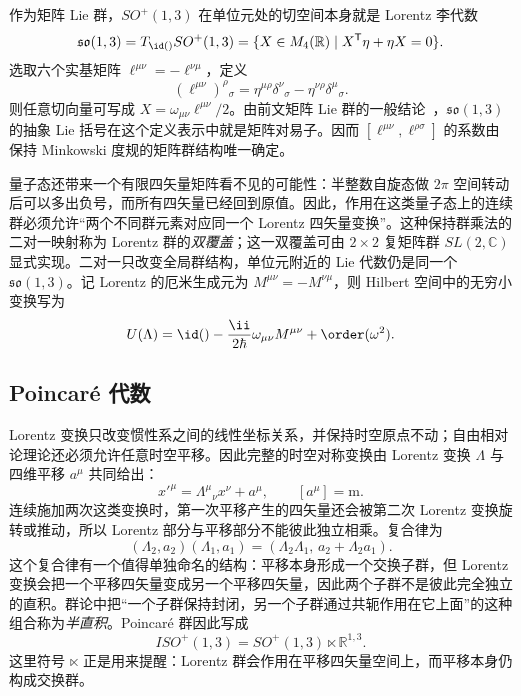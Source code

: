 作为矩阵 Lie 群，$SO^+(1,3)$ 在单位元处的切空间本身就是 Lorentz 李代数
\begin{equation}
{
\mathfrak{so}(1,3)
=T_{\id()}SO^+(1,3)
=\{X\in M_4(\mathbb R)\mid X^{\mathsf T}\eta+\eta X=0\}.}
\label{eq:lorentz-lie-algebra-tangent}
\end{equation}
选取六个实基矩阵 $\ell^{\mu\nu}=-\ell^{\nu\mu}$，定义
\begin{equation}
{
(\ell^{\mu\nu})^\rho{}_{\sigma}
=\eta^{\mu\rho}\delta^\nu{}_{\sigma}
-\eta^{\nu\rho}\delta^\mu{}_{\sigma}.}
\label{eq:lorentz-matrix-basis}
\end{equation}
则任意切向量可写成 $X=\omega_{\mu\nu}\ell^{\mu\nu}/2$。由前文矩阵 Lie 群的一般结论~，$\mathfrak{so}(1,3)$ 的抽象 Lie 括号在这个定义表示中就是矩阵对易子。因而 $[\ell^{\mu\nu},\ell^{\rho\sigma}]$ 的系数由保持 Minkowski 度规的矩阵群结构唯一确定。

量子态还带来一个有限四矢量矩阵看不见的可能性：半整数自旋态做 $2\pi$ 空间转动后可以多出负号，而所有四矢量已经回到原值。因此，作用在这类量子态上的连续群必须允许“两个不同群元素对应同一个 Lorentz 四矢量变换”。这种保持群乘法的二对一映射称为 Lorentz 群的\emph{双覆盖}；这一双覆盖可由 $2\times2$ 复矩阵群 $SL(2,\mathbb C)$ 显式实现。二对一只改变全局群结构，单位元附近的 Lie 代数仍是同一个 $\mathfrak{so}(1,3)$。记 Lorentz 的厄米生成元为 $M^{\mu\nu}=-M^{\nu\mu}$，则 Hilbert 空间中的无穷小变换写为
\begin{equation}
 U(\Lambda)
 =\id()-\frac{\ii}{2\hbar}\omega_{\mu\nu}M^{\mu\nu}+\order(\omega^2).
 \label{eq:lorentz-unitary}
\end{equation}
\subsection{Poincar\'e 代数}

Lorentz 变换只改变惯性系之间的线性坐标关系，并保持时空原点不动；自由相对论理论还必须允许任意时空平移。因此完整的时空对称变换由 Lorentz 变换 $\Lambda$ 与四维平移 $a^\mu$ 共同给出：
\begin{equation}
 x'^\mu=\Lambda^\mu{}_{\nu}x^\nu+a^\mu,
 \qquad [a^\mu]=\mathrm m.
 \label{eq:poincare-affine-action-r15}
\end{equation}
连续施加两次这类变换时，第一次平移产生的四矢量还会被第二次 Lorentz 变换旋转或推动，所以 Lorentz 部分与平移部分不能彼此独立相乘。复合律为
\begin{equation}
 {
 (\Lambda_2,a_2)(\Lambda_1,a_1)
 =(\Lambda_2\Lambda_1,\,a_2+\Lambda_2a_1).}
 \label{eq:poincare-group-law-r15}
\end{equation}
这个复合律有一个值得单独命名的结构：平移本身形成一个交换子群，但 Lorentz 变换会把一个平移四矢量变成另一个平移四矢量，因此两个子群不是彼此完全独立的直积。群论中把“一个子群保持封闭，另一个子群通过共轭作用在它上面”的这种组合称为\emph{半直积}。Poincar\'e 群因此写成
\begin{equation*}
 ISO^+(1,3)=SO^+(1,3)\ltimes\mathbb R^{1,3}.
\end{equation*}
这里符号 $\ltimes$ 正是用来提醒：Lorentz 群会作用在平移四矢量空间上，而平移本身仍构成交换群。

